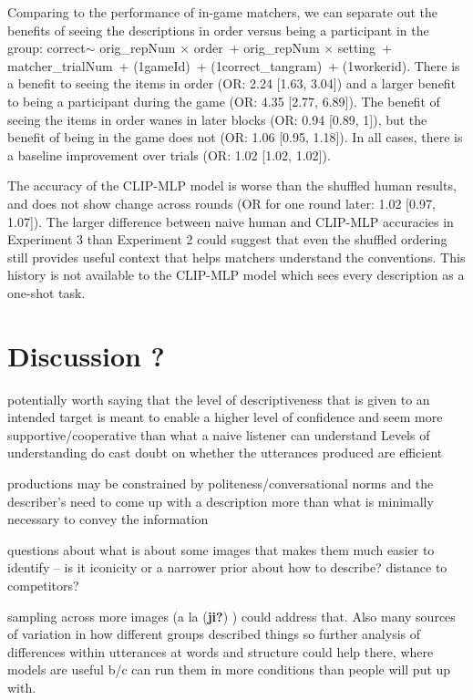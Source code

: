 \documentclass[10pt, letterpaper]{article}
\begin{document}
Comparing to the performance of in-game matchers, we can separate out
the benefits of seeing the descriptions in order versus being a
participant in the group: correct\(\sim\) orig\_repNum \(\times\)
order~+ orig\_repNum \(\times\) setting~+ matcher\_trialNum~+
(1\textbar gameId)~+ (1\textbar correct\_tangram)~+
(1\textbar workerid). There is a benefit to seeing the items in order
(OR: 2.24 {[}1.63, 3.04{]}) and a larger benefit to being a participant
during the game (OR: 4.35 {[}2.77, 6.89{]}). The benefit of seeing the
items in order wanes in later blocks (OR: 0.94 {[}0.89, 1{]}), but the
benefit of being in the game does not (OR: 1.06 {[}0.95, 1.18{]}). In
all cases, there is a baseline improvement over trials (OR: 1.02
{[}1.02, 1.02{]}).

The accuracy of the CLIP-MLP model is worse than the shuffled human
results, and does not show change across rounds (OR for one round later:
1.02 {[}0.97, 1.07{]}). The larger difference between naive human and
CLIP-MLP accuracies in Experiment 3 than Experiment 2 could suggest that
even the shuffled ordering still provides useful context that helps
matchers understand the conventions. This history is not available to
the CLIP-MLP model which sees every description as a one-shot task.

\section{Discussion ?}\label{discussion}

potentially worth saying that the level of descriptiveness that is given
to an intended target is meant to enable a higher level of confidence
and seem more supportive/cooperative than what a naive listener can
understand Levels of understanding do cast doubt on whether the
utterances produced are efficient

productions may be constrained by politeness/conversational norms and
the describer's need to come up with a description more than what is
minimally necessary to convey the information

questions about what is about some images that makes them much easier to
identify -- is it iconicity or a narrower prior about how to describe?
distance to competitors?

sampling across more images (a la (\textbf{ji?}) ) could address that.
Also many sources of variation in how different groups described things
so further analysis of differences within utterances at words and
structure could help there, where models are useful b/c can run them in
more conditions than people will put up with.
\end{document}
